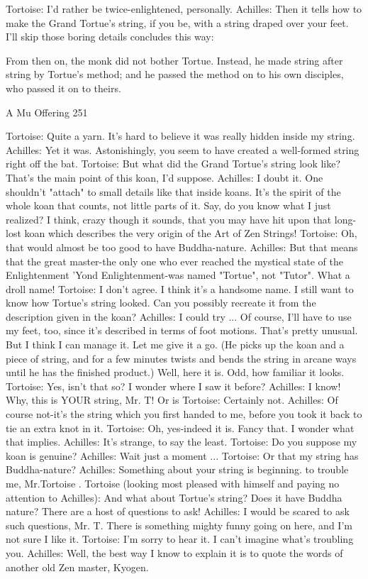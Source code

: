 Tortoise: I'd rather be twice-enlightened, personally.
Achilles: Then it tells how to make the Grand Tortue's string, if you be, with a string
   draped over your feet. I'll skip those boring details concludes this way:

   From then on, the monk did not bother Tortue. Instead, he made string after string
   by Tortue's method; and he passed the method on to his own disciples, who passed
   it on to theirs.




A Mu Offering                                                                          251

Tortoise: Quite a yarn. It's hard to believe it was really hidden inside my string.
Achilles: Yet it was. Astonishingly, you seem to have created a well-formed string right
   off the bat.
Tortoise: But what did the Grand Tortue's string look like? That's the main point of this
   koan, I'd suppose.
Achilles: I doubt it. One shouldn't "attach" to small details like that inside koans. It's the
   spirit of the whole koan that counts, not little parts of it. Say, do you know what I just
   realized? I think, crazy though it sounds, that you may have hit upon that long-lost
   koan which describes the very origin of the Art of Zen Strings!
Tortoise: Oh, that would almost be too good to have Buddha-nature.
Achilles: But that means that the great master-the only one who ever reached the mystical
   state of the Enlightenment 'Yond Enlightenment-was named "Tortue", not "Tutor".
   What a droll name!
Tortoise: I don't agree. I think it's a handsome name. I still want to know how Tortue's
   string looked. Can you possibly recreate it from the description given in the koan?
Achilles: I could try ... Of course, I'll have to use my feet, too, since it's described in
   terms of foot motions. That's pretty unusual. But I think I can manage it. Let me give
   it a go. (He picks up the koan and a piece of string, and for a few minutes twists and
   bends the string in arcane ways until he has the finished product.) Well, here it is.
   Odd, how familiar it looks.
Tortoise: Yes, isn't that so? I wonder where I saw it before? Achilles: I know! Why, this
   is YOUR string, Mr. T! Or is Tortoise: Certainly not.
Achilles: Of course not-it's the string which you first handed to me, before you took it
   back to tie an extra knot in it.
Tortoise: Oh, yes-indeed it is. Fancy that. I wonder what that implies.
Achilles: It's strange, to say the least.
Tortoise: Do you suppose my koan is genuine?
Achilles: Wait just a moment ...
Tortoise: Or that my string has Buddha-nature?
Achilles: Something about your string is beginning. to trouble me, Mr.Tortoise .
Tortoise (looking most pleased with himself and paying no attention to Achilles): And
   what about Tortue's string? Does it have Buddha nature? There are a host of questions
   to ask!
Achilles: I would be scared to ask such questions, Mr. T. There is something mighty
   funny going on here, and I'm not sure I like it. Tortoise: I'm sorry to hear it. I can't
   imagine what's troubling you. Achilles: Well, the best way I know to explain it is to
   quote the words of another old Zen master, Kyogen.





